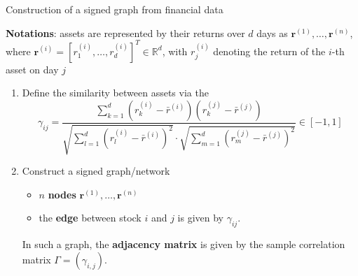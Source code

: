 \documentclass[dvipsnames,mathserif]{beamer}
\newcommand\mypv{\vfill \ifthenelse{\boolean{withPause}}{ \pause }{}}
\begin{document}
\begin{frame}{Construction of a signed graph from financial data}
\vfill

\textbf{Notations}: assets are represented by their returns over $d$ days as $\mathbf{r}^{(1)}, \ldots, \mathbf{r}^{(n)}$, where $\mathbf{r}^{(i)} = [ r^{(i)}_1, \ldots, r^{(i)}_d ]^T \in \mathbb{R}^d$, with $r^{(i)}_j$ denoting the return of the $i$-th asset on day $j$
    
\centering
\begin{enumerate}
        \item Define the similarity between assets via the  
        \[
        \gamma_{ij} = \frac{\sum_{k=1}^d (r^{(i)}_k - \bar{r}^{(i)})(r^{(j)}_k - \bar{r}^{(j)})}{\sqrt{\sum_{l=1}^d (r^{(i)}_l - \bar{r}^{(i)})^2} \cdot \sqrt{\sum_{m=1}^d (r^{(j)}_m - \bar{r}^{(j)})^2}} \in [-1, 1]
        \]

\mypv 
        \item Construct a signed graph/network
        \begin{itemize}
            \item $n$ \textbf{nodes} $\mathbf{r}^{(1)}, \ldots, \mathbf{r}^{(n)}$
            \item the \textbf{edge} between stock $i$ and $j$ is given by \(\gamma_{ij}\).
        \end{itemize}

\vfill 
        In such a graph, the \textbf{adjacency matrix} is given by the sample correlation matrix \(\Gamma = (\gamma_{i,j})\).
    \end{enumerate}



\vfill
\end{frame}

\end{document}
